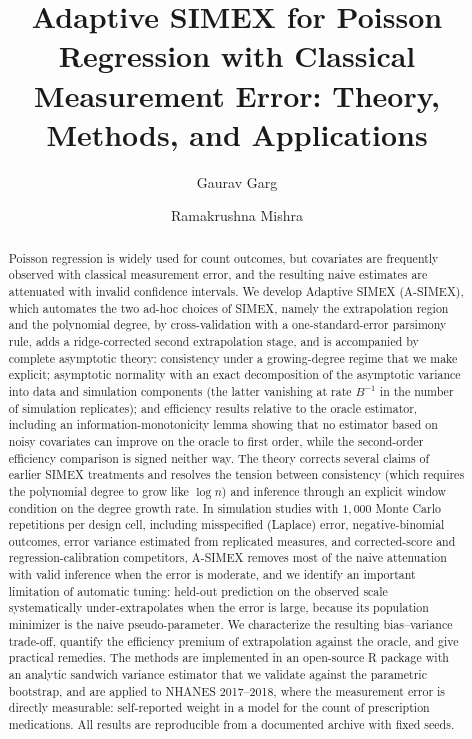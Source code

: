 \documentclass[3p,11pt]{elsarticle}
\theoremstyle{plain}
\theoremstyle{definition}
\begin{document}
\begin{frontmatter}

\title{Adaptive SIMEX for Poisson Regression with Classical
Measurement Error: Theory, Methods, and Applications}

\author[iiml]{Gaurav Garg}
\author[iiml]{Ramakrushna Mishra}

\begin{abstract}
Poisson regression is widely used for count outcomes, but covariates are
frequently observed with classical measurement error, and the resulting
naive estimates are attenuated with invalid confidence intervals. We
develop Adaptive SIMEX (A-SIMEX), which automates the two ad-hoc choices
of SIMEX, namely the extrapolation region and the polynomial degree, by
cross-validation with a one-standard-error parsimony rule, adds a
ridge-corrected second extrapolation stage, and is accompanied by
complete asymptotic theory: consistency under a growing-degree regime
that we make explicit; asymptotic normality with an exact decomposition
of the asymptotic variance into data and simulation components (the
latter vanishing at rate $B^{-1}$ in the number of simulation
replicates); and efficiency results relative to the oracle estimator,
including an information-monotonicity lemma showing that no estimator
based on noisy covariates can improve on the oracle to first order,
while the second-order efficiency comparison is signed neither way. The
theory corrects several claims of earlier SIMEX treatments and resolves
the tension between consistency (which requires the polynomial degree to
grow like $\log n$) and inference through an explicit window condition
on the degree growth rate. In simulation studies with $1{,}000$ Monte
Carlo repetitions per design cell, including misspecified (Laplace)
error, negative-binomial outcomes, error variance estimated from
replicated measures, and corrected-score and regression-calibration
competitors, A-SIMEX removes most of the naive attenuation with valid
inference when the error is moderate, and we identify an important
limitation of automatic tuning: held-out prediction on the observed
scale systematically under-extrapolates when the error is large,
because its population minimizer is the naive pseudo-parameter. We
characterize the resulting bias--variance trade-off, quantify the
efficiency premium of extrapolation against the oracle, and give
practical remedies. The methods are implemented in an open-source R
package with an analytic sandwich variance estimator that we validate
against the parametric bootstrap, and are applied to NHANES 2017--2018,
where the measurement error is directly measurable: self-reported
weight in a model for the count of prescription medications. All
results are reproducible from a documented archive with fixed seeds.


\end{abstract}
\end{frontmatter}
\end{document}
